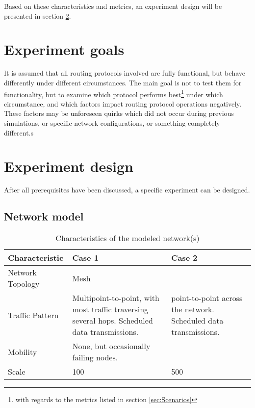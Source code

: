 \documentclass{acm_proc_article-sp}
\begin{document}
Based on these characteristics and metrics, an experiment design will be presented in section \ref{sec:Design}.


\section{Experiment goals}
\label{sec:Goals}
It is assumed that all routing protocols involved are fully functional, but behave differently under different circumstances. The main goal is not to test them for functionality, but to examine which protocol performs best\footnote{ with regards to the metrics listed in section \ref{sec:Scenarios}} under which circumstance, and which factors impact routing protocol operations negatively. These factors may be unforeseen quirks which did not occur during previous simulations, or specific network configurations, or something completely different.s

\section{Experiment design}
\label{sec:Design}
After all prerequisites have been discussed, a specific experiment can be designed.

\subsection{Network model}
\label{subsec:Model}

\begin{table*}[t]
    \begin{tabularx}{\textwidth}{l | X | X  }
      Characteristic & Case 1 & Case 2 \\
      \hline
      Network Topology & Mesh & \\
      Traffic Pattern & Multipoint-to-point, with most traffic traversing several hops. Scheduled data transmissions. & point-to-point across the network. Scheduled data transmissions. \\
      Mobility & None, but occasionally failing nodes. & \\
      Scale & 100 & 500\\
    \end{tabularx}
    \caption{Characteristics of the modeled network(s)}
    \label{fig:characteristics}
\end{table*}
\end{document}
